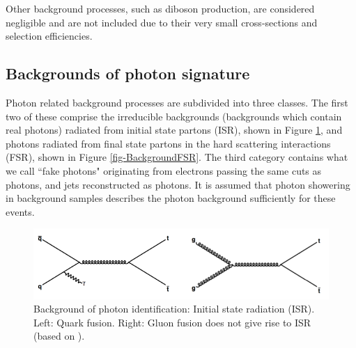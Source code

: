 Other background processes, such as diboson production, are considered negligible and are not included due to their very small cross-sections and selection efficiencies.

\subsection{Backgrounds of photon signature}

Photon related background processes are subdivided into three classes. The first two of these comprise the irreducible backgrounds (backgrounds which contain real photons) radiated from initial state partons (ISR), shown in Figure \ref{fig-BackgroundISR}, and photons radiated from final state partons in the hard scattering interactions (FSR), shown in Figure \ref{fig-BackgroundFSR}. The third category contains what we call ``fake photons" originating from electrons passing the same cuts as photons, and jets reconstructed as photons. It is assumed that photon showering in background samples describes the photon background sufficiently for these events. 


\newpage

\begin{figure} [h!]
\begin{center}
\includegraphics[width=\textwidth]{Figures/BackgroundISR.png}
\end{center}
\caption{Background of photon identification: Initial state radiation (ISR). Left: Quark fusion. Right: Gluon fusion does not give rise to ISR (based on \cite{photonbackgrounds}).}
\label{fig-BackgroundISR}
\end{figure}

